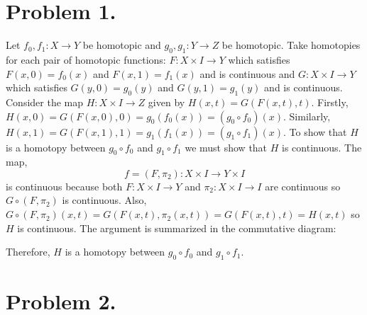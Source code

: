 \documentclass[12pt]{extarticle}
\begin{document}
 
\section*{Problem 1.}

Let $f_0, f_1 : X \to Y$ be homotopic and $g_0, g_1 : Y \to Z$ be homotopic. Take homotopies for each pair of homotopic functions: $F : X \times I \to Y$ which satisfies $F(x, 0) = f_0(x)$ and $F(x, 1) = f_1(x)$ and is continuous and $G : X \times I \to Y$ which satisfies $G(y, 0) = g_0(y)$ and $G(y, 1) = g_1(y)$ and is continuous. Consider the map $H : X \times I \to Z$ given by $H(x, t) = G(F(x,t),t)$. Firstly, $H(x, 0) = G(F(x, 0), 0) = g_0(f_0(x)) = (g_0 \circ f_0)(x)$. Similarly, $H(x, 1) = G(F(x, 1), 1) = g_1(f_1(x)) = (g_1 \circ f_1)(x)$. To show that $H$ is a homotopy between $g_0 \circ f_0$ and $g_1 \circ f_1$ we must show that $H$ is continuous. The map, 
\[f = (F, \pi_2) : X \times I \to Y \times I\] 
is continuous because both $F : X \times I \to Y$ and $\pi_2 : X \times I \to I$ are continuous so $G \circ (F, \pi_2)$ is continuous. Also, $G \circ (F, \pi_2) (x,t) = G(F(x,t), \pi_2(x,t)) = G(F(x,t), t) = H(x,t)$ so $H$ is continuous. The argument is summarized in the commutative diagram:

\begin{center}
\end{center}
Therefore, $H$ is a homotopy between $g_0 \circ f_0$ and $g_1 \circ f_1$.
 
\section*{Problem 2.}    
\end{document}
